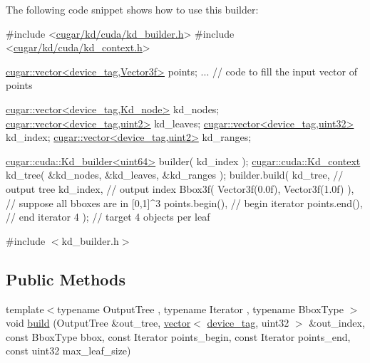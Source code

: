 The following code snippet shows how to use this builder\+:


\begin{DoxyCode}
\textcolor{preprocessor}{#include <\hyperlink{kd__builder_8h}{cugar/kd/cuda/kd\_builder.h}>}
\textcolor{preprocessor}{#include <\hyperlink{kd__context_8h}{cugar/kd/cuda/kd\_context.h}>}

\hyperlink{structcugar_1_1vector}{cugar::vector<device\_tag,Vector3f>} points;
... \textcolor{comment}{// code to fill the input vector of points}

\hyperlink{structcugar_1_1vector}{cugar::vector<device\_tag,Kd\_node>}  kd\_nodes;
\hyperlink{structcugar_1_1vector}{cugar::vector<device\_tag,uint2>}    kd\_leaves;
\hyperlink{structcugar_1_1vector}{cugar::vector<device\_tag,uint32>}   kd\_index;
\hyperlink{structcugar_1_1vector}{cugar::vector<device\_tag,uint2>}    kd\_ranges;

\hyperlink{structcugar_1_1cuda_1_1_kd__builder}{cugar::cuda::Kd\_builder<uint64>} builder( kd\_index );
\hyperlink{structcugar_1_1cuda_1_1_kd__context}{cugar::cuda::Kd\_context} kd\_tree( &kd\_nodes, &kd\_leaves, &kd\_ranges );
builder.build(
    kd\_tree,                                    \textcolor{comment}{// output tree}
    kd\_index,                                   \textcolor{comment}{// output index}
    Bbox3f( Vector3f(0.0f), Vector3f(1.0f) ),   \textcolor{comment}{// suppose all bboxes are in [0,1]^3}
    points.begin(),                             \textcolor{comment}{// begin iterator}
    points.end(),                               \textcolor{comment}{// end iterator}
    4 );                                        \textcolor{comment}{// target 4 objects per leaf}
\end{DoxyCode}
 

{\ttfamily \#include $<$kd\+\_\+builder.\+h$>$}

\subsection*{Public Methods}
\begin{DoxyCompactItemize}
\item 
{\footnotesize template$<$typename Output\+Tree , typename Iterator , typename Bbox\+Type $>$ }\\void \hyperlink{structcugar_1_1cuda_1_1_kd__builder_a3406ba54cf8cb747ac03065e0df5398f}{build} (Output\+Tree \&out\+\_\+tree, \hyperlink{structcugar_1_1vector}{vector}$<$ \hyperlink{structcugar_1_1device__tag}{device\+\_\+tag}, uint32 $>$ \&out\+\_\+index, const Bbox\+Type bbox, const Iterator points\+\_\+begin, const Iterator points\+\_\+end, const uint32 max\+\_\+leaf\+\_\+size)
\end{DoxyCompactItemize}
